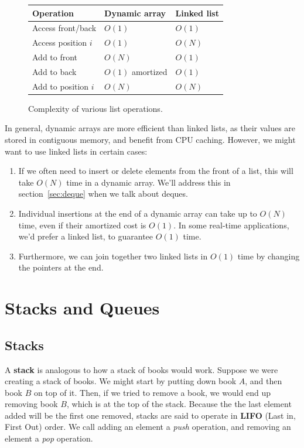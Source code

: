 \begin{figure}[b]
\centering
\begin{tabular}{| l | l | l |} \hline
    \textbf{Operation}           & \textbf{Dynamic array}    & \textbf{Linked list}  \\ \hline
    Access front/back   & $O(1)$           & $O(1)$       \\ \hline
    Access position $i$ & $O(1)$           & $O(N)$       \\ \hline
    Add to front        & $O(N)$           & $O(1)$       \\ \hline
    Add to back         & $O(1)$ amortized & $O(1)$       \\ \hline
    Add to position $i$ & $O(N)$           & $O(N)$       \\ \hline
\end{tabular}
\caption{Complexity of various list operations.}
\end{figure}

In general, dynamic arrays are more efficient than linked lists, as their values are stored in contiguous memory, and benefit from CPU caching. However, we might want to use linked lists in certain cases:

\begin{enumerate}
    \item If we often need to insert or delete elements from the front of a list, this will take $O(N)$ time in a dynamic array. We'll address this in section~\ref{sec:deque} when we talk about deques.
    \item Individual insertions at the end of a dynamic array can take up to $O(N)$ time, even if their amortized cost is $O(1)$. In some real-time applications, we'd prefer a linked list, to guarantee $O(1)$ time.
    \item Furthermore, we can join together two linked lists in $O(1)$ time by changing the pointers at the end.
\end{enumerate}


\section{Stacks and Queues}

\subsection{Stacks}

A \textbf{stack} is analogous to how a stack of books would work. Suppose we were creating a stack of books. We might start by putting down book $A$, and then book $B$ on top of it. Then, if we tried to remove a book, we would end up removing book $B$, which is at the top of the stack. Because the the last element added will be the first one removed, stacks are said to operate in \textbf{LIFO} (Last in, First Out) order. We call adding an element a \textit{push} operation, and removing an element a \textit{pop} operation.

